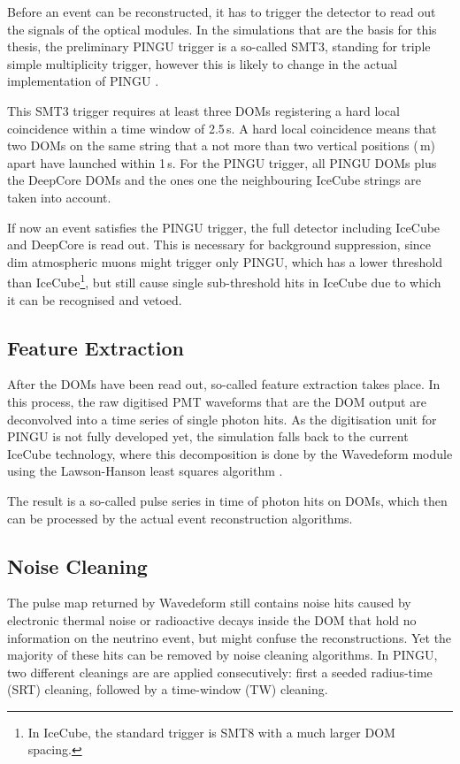 Before an event can be reconstructed, it has to trigger the detector to read out
the signals of the optical modules. In the simulations that are the basis for
this thesis, the preliminary PINGU trigger is a so-called SMT3, standing for
triple simple multiplicity trigger, however this is likely to change in the
actual implementation of PINGU \cite{Trigger}.

This SMT3 trigger requires at least three DOMs registering a hard local
coincidence within a time window of 2.5\,\textmu s. A hard local coincidence
means that two DOMs on the same string that a not more than two vertical
positions (\,m) apart have launched within 1\,\textmu s. For the PINGU
trigger, all PINGU DOMs plus the DeepCore DOMs and the ones one the neighbouring
IceCube strings are taken into account.

If now an event satisfies the PINGU trigger, the full detector including
IceCube and DeepCore is read out. This is necessary for background suppression,
since dim atmospheric muons might trigger only PINGU, which has a lower
threshold than IceCube\footnote{In IceCube, the standard trigger is SMT8 with a
much larger DOM spacing.}, but still cause single sub-threshold hits in IceCube
due to which it can be recognised and vetoed.


\subsection{Feature Extraction}
\label{sec:reco_feature}

After the DOMs have been read out, so-called feature extraction takes place. In
this process, the raw digitised PMT waveforms that are the DOM output are
deconvolved into a time series of single photon hits. As the digitisation unit
for PINGU is not fully developed yet, the simulation falls back to the current
IceCube technology, where this decomposition is done by the Wavedeform module
\cite{Wavedeform} using the Lawson-Hanson least squares algorithm
\cite{LawsonHanson}.

The result is a so-called pulse series in time of photon hits on DOMs, which
then can be processed by the actual event reconstruction algorithms.

\subsection{Noise Cleaning}
\label{sec:reco_noise}

The pulse map returned by Wavedeform still contains noise hits caused by
electronic thermal noise or radioactive decays inside the DOM that hold no
information on the neutrino event, but might confuse the reconstructions. Yet
the majority of these hits can be removed by noise cleaning algorithms. In
PINGU, two different cleanings are are applied consecutively: first a seeded
radius-time (SRT) cleaning, followed by a time-window (TW) cleaning.

